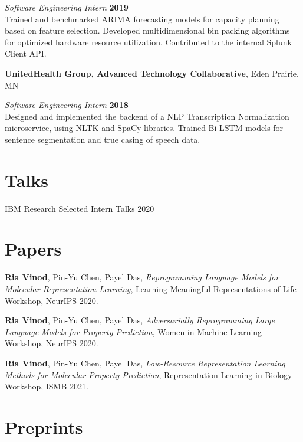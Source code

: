 \documentclass[mm,line]{res}
\begin{document}
\begin{resume}
\vspace{-.4cm}
{\em Software Engineering Intern} \hfill {\bf 2019}\\
Trained and benchmarked ARIMA forecasting models for capacity planning based on feature selection. Developed multidimensional bin packing algorithms for optimized hardware resource utilization. Contributed to the internal Splunk Client API. 


{\bf UnitedHealth Group, Advanced Technology Collaborative}, Eden Prairie, MN

\vspace{-.4cm}
{\em Software Engineering Intern} \hfill {\bf 2018}\\
Designed and implemented the backend of a NLP Transcription Normalization microservice, using NLTK and SpaCy libraries. Trained Bi-LSTM models for sentence segmentation and true casing of speech data. \newline

\section{\sc Talks}

IBM Research Selected Intern Talks 2020


\section{\sc Papers}

{\bf Ria Vinod}, Pin-Yu Chen, Payel Das, \emph{Reprogramming Language Models for Molecular Representation Learning}, Learning Meaningful Representations of Life Workshop, NeurIPS 2020. \hfill {}

{\bf Ria Vinod}, Pin-Yu Chen, Payel Das, \emph{Adversarially Reprogramming Large Language Models for Property Prediction}, Women in Machine Learning Workshop, NeurIPS 2020. \hfill {}


{\bf Ria Vinod}, Pin-Yu Chen, Payel Das, \emph{Low-Resource Representation Learning Methods for Molecular Property Prediction}, Representation Learning in Biology Workshop, ISMB 2021.


\section{\sc Preprints}


\end{resume}
\end{document}
